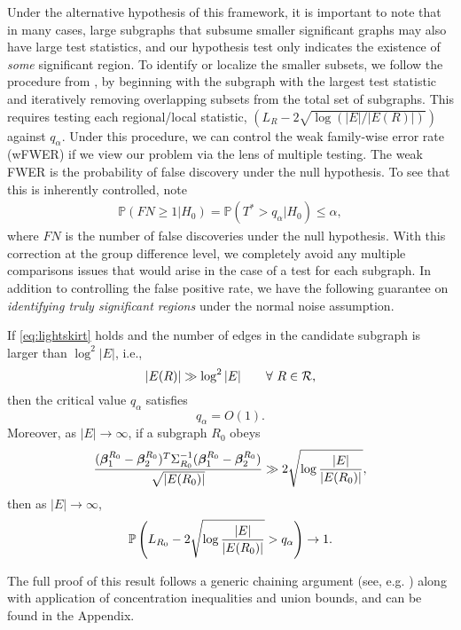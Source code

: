 Under the alternative hypothesis of this framework, it is important to note that in many cases,
large subgraphs that subsume smaller significant graphs may also have large test statistics, and our hypothesis test only indicates the existence of {\em some} significant region. To identify or localize the smaller subsets, we follow the procedure from \cite{jeng2010optimal}, by beginning with the subgraph with the largest test statistic and iteratively removing overlapping subsets from the total set of subgraphs. This requires testing each regional/local statistic, $(L_R - 2\sqrt{\log(|E|/|E(R)|)})$ against $q_\alpha$. Under this procedure, we can control the weak family-wise error rate (wFWER) if we view our problem via the lens of multiple testing. The weak FWER is the probability of false discovery under the null hypothesis. To see that this is inherently controlled, note
\begin{align}
\mathbb{P}(FN \geq 1|H_0) = \mathbb{P}(T^* > q_\alpha|H_0) \leq \alpha, 
\end{align}
where $FN$ is the number of false discoveries under the null hypothesis. With this correction at the group difference level, we completely avoid any multiple comparisons issues that would arise in the case of a test for each subgraph.
%
In addition to controlling the false positive rate, we have the following guarantee on {\em identifying truly significant regions} under the normal noise assumption.
\begin{theorem}
If \eqref{eq:lightskirt} holds and the number of edges in the candidate subgraph is larger than $\log^2 |E|$, i.e.,
\begin{equation}
\label{eq:setsize}
|E(R)|\gg \log^2 |E|\qquad \forall\ R\in\mathcal{R},
\end{equation}
then the critical value $q_\alpha$ satisfies
\begin{equation}
\label{eq:criticalvl}
q_\alpha=O(1).
\end{equation}
Moreover, as $|E|\to \infty$, if a subgraph $R_0$ obeys 
\begin{equation}
\label{eq:sigcond}
\frac{(\bm{\beta}_1^{R_0}-\bm{\beta}_2^{R_0})^T\Sigma_{R_0}^{-1}(\bm{\beta}_1^{R_0}-\bm{\beta}_2^{R_0})}{\sqrt{|E({R_0})|}}\gg 2\sqrt{\log\frac{|E|}{|E({R_0})|}},
\end{equation}
then as $|E|\to \infty$,
\begin{equation}
\label{eq:power}
\mathbb{P}\left(L_{R_0}-2\sqrt{\log\frac{|E|}{|E({R_0})|}}>q_\alpha\right)\to 1.
\end{equation}
\label{lm:mainthm}
\end{theorem}
The full proof of this result follows a generic chaining argument (see, e.g. \cite{talagrand2006generic}) along with application of 
concentration inequalities and union bounds, and can be found in the Appendix. 

